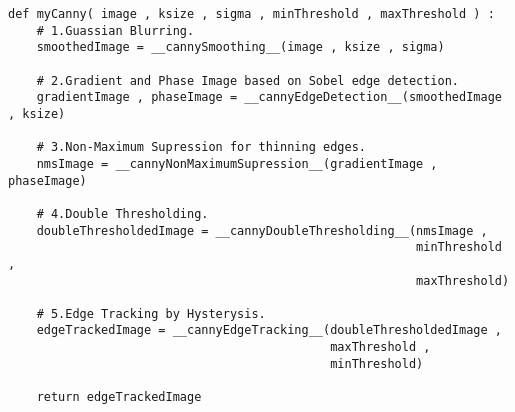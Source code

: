 
\begin{lstlisting}
def myCanny( image , ksize , sigma , minThreshold , maxThreshold ) :
    # 1.Guassian Blurring.
    smoothedImage = __cannySmoothing__(image , ksize , sigma)

    # 2.Gradient and Phase Image based on Sobel edge detection.
    gradientImage , phaseImage = __cannyEdgeDetection__(smoothedImage , ksize)

    # 3.Non-Maximum Supression for thinning edges.
    nmsImage = __cannyNonMaximumSupression__(gradientImage , phaseImage)

    # 4.Double Thresholding.
    doubleThresholdedImage = __cannyDoubleThresholding__(nmsImage ,
                                                         minThreshold ,
                                                         maxThreshold)

    # 5.Edge Tracking by Hysterysis.
    edgeTrackedImage = __cannyEdgeTracking__(doubleThresholdedImage ,
                                             maxThreshold ,
                                             minThreshold)

    return edgeTrackedImage
\end{lstlisting}
